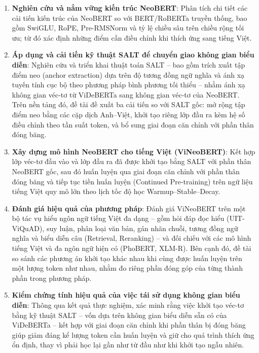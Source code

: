 \begin{enumerate}
    \item \textbf{Nghiên cứu và nắm vững kiến trúc NeoBERT}: Phân tích chi tiết các
    cải tiến kiến trúc của NeoBERT so với BERT/RoBERTa truyền thống, bao gồm SwiGLU,
    RoPE, Pre-RMSNorm và tỷ lệ chiều sâu trên chiều rộng tối ưu; từ đó xác định những điểm cần
    điều chỉnh khi thích ứng sang tiếng Việt.

    \item \textbf{Áp dụng và cải tiến kỹ thuật SALT để chuyển giao không gian biểu
    diễn}: Nghiên cứu và triển khai thuật toán SALT -- bao gồm trích xuất tập điểm neo
    (anchor extraction) dựa trên độ tương đồng ngữ nghĩa và ánh xạ tuyến tính cục bộ
    theo phương pháp bình phương tối thiểu -- nhằm ánh xạ không gian véc-tơ từ
    ViDeBERTa sang không gian véc-tơ của NeoBERT. Trên nền tảng đó, đề tài đề xuất ba
    cải tiến so với SALT gốc: mở rộng tập điểm neo bằng các cặp dịch Anh--Việt, khởi 
    tạo riêng lớp đầu ra kèm hệ số điều chỉnh theo tần suất token,
    và bổ sung giai đoạn căn chỉnh với phần thân đóng băng.

    \item \textbf{Xây dựng mô hình NeoBERT cho tiếng Việt (ViNeoBERT)}: Kết hợp lớp véc-tơ đầu vào và lớp đầu ra đã được khởi tạo bằng SALT với phần thân NeoBERT gốc, sau đó huấn
    luyện qua giai đoạn căn chỉnh với phần thân đóng băng và tiếp tục tiền huấn luyện
    (Continued Pre-training) trên ngữ liệu tiếng Việt quy mô lớn theo lịch tốc độ
    học Warmup--Stable--Decay.

    \item \textbf{Đánh giá hiệu quả của phương pháp}: Đánh giá ViNeoBERT trên một bộ
    tác vụ hiểu ngôn ngữ tiếng Việt đa dạng -- gồm hỏi đáp đọc hiểu (UIT-ViQuAD), suy
    luận, phân loại văn bản, gán nhãn chuỗi, tương đồng ngữ nghĩa và biểu diễn câu
    (Retrieval, Reranking) -- và đối chiếu với các mô hình tiếng Việt và đa ngôn ngữ
    hiện có (PhoBERT, XLM-R). Bên cạnh đó, đề tài so sánh các phương án khởi tạo khác nhau
    khi cùng được huấn luyện trên một lượng token như nhau, nhằm đo riêng phần đóng góp
    của từng thành phần trong phương pháp.

    \item \textbf{Kiểm chứng tính hiệu quả của việc tái sử dụng không gian biểu diễn}: Thông qua
    kết quả thực nghiệm, xác minh rằng việc khởi tạo véc-tơ bằng kỹ thuật SALT -- vốn
    dựa trên không gian biểu diễn sẵn có của ViDeBERTa -- kết hợp với giai đoạn căn chỉnh
    khi phần thân bị đóng băng giúp giảm đáng kể lượng token cần huấn luyện và giữ cho
    quá trình thích ứng ổn định, thay vì phải học lại gần như từ đầu như khi khởi tạo
    ngẫu nhiên.
\end{enumerate}

